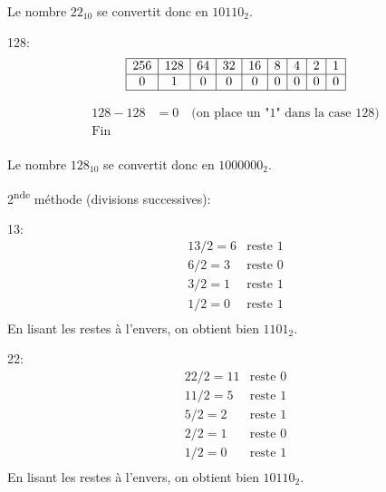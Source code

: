 \documentclass[12pt]{article}
\begin{document}
\begin{MaReponse}
\begin{alphenum}
				Le nombre \(22_{10}\) se convertit donc en \(10110_{2}\).
			\item 128:
				\[
				\begin{array}{|c|c|c|c|c|c|c|c|c|}
					\hline
					256 & 128 & 64 & 32 & 16 & 8 & 4 & 2 & 1 \\
					\hline
					0 & 1 & 0 & 0 & 0 & 0 & 0 & 0 & 0\\
					\hline
				\end{array}
				\]
				
				\[
				\begin{array}{ll}
					128 - 128 &= 0 \quad \text{(on place un "1" dans la case \(128\))} \\
					\text{Fin} & \\
				\end{array}
				\]
				
				Le nombre \(128_{10}\) se convertit donc en \(1000000_{2}\).
			
		\end{alphenum}
		
		2\textsuperscript{nde} méthode (divisions successives):
		\begin{alphenum}
			\item 13:
				\[
				\begin{array}{ll}
					13 / 2 = 6 & \text{reste } 1 \\
					6 / 2 = 3 & \text{reste } 0 \\
					3 / 2 = 1 & \text{reste } 1 \\
					1 / 2 = 0 & \text{reste } 1 \\
				\end{array}
				\]
				En lisant les restes à l'envers, on obtient bien \(1101_{2}\).
			
			\item 22:
				\[
				\begin{array}{ll}
					22/ 2 = 11 & \text{reste } 0 \\
					11 / 2 = 5 & \text{reste } 1 \\
					5 / 2 = 2 & \text{reste } 1 \\
					2 / 2 = 1 & \text{reste } 0 \\
					1 / 2 = 0 & \text{reste } 1 \\
				\end{array}
				\]
				En lisant les restes à l'envers, on obtient bien \(10110_{2}\).
				

\end{alphenum}
\end{MaReponse}
\end{document}
